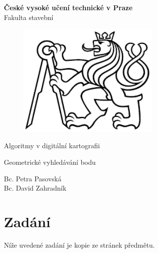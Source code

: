 \documentclass[a4paper, 12pt]{article}
\begin{document}
\begin{titlepage}
\begin{center}
\noindent
\Large \textbf{České vysoké učení technické v Praze }\\ Fakulta stavební
\vspace{5cm}

\huge

\begin{figure}[h!]
	\centering
	\includegraphics[width=7cm]{logo.png}
\end{figure}

\vspace{0.5cm}

Algoritmy v digitální kartografii \\

\vspace{3cm}

\Huge  
Geometrické vyhledávání bodu\\

\vspace{2cm}

\Large
Bc. Petra Pasovská \\
Bc. David Zahradník \\

\end{center}

\end{titlepage}




\pagestyle{plain}     %
\setcounter{page}{1}  %

\tableofcontents
\newpage

\section{Zadání}
Níže uvedené zadání je kopie ze stránek předmětu. 
\end{document}
